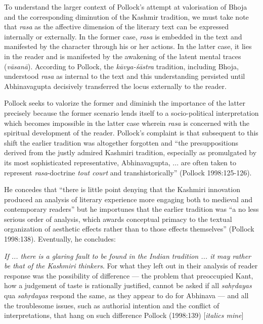 To understand the larger context of Pollock's attempt at valorisation of Bhoja and the corresponding diminution of the Kashmir tradition, we must take note that \textsl{rasa} as the affective dimension of the literary text can be expressed internally or externally. In the former case, \textsl{rasa} is embedded in the text and manifested by the character through his or her actions. In the latter case, it lies in the reader and is manifested by the awakening of the latent mental traces (\textsl{vāsanā}). According to Pollock, the \textsl{kāvya-śāstra} tradition, including Bhoja, understood \textsl{rasa} as internal to the text and this understanding persisted until Abhinavagupta decisively transferred the locus externally to the reader. 

Pollock seeks to valorize the former and diminish the importance of the latter precisely because the former scenario lends itself to a socio-political interpretation which becomes impossible in the latter case wherein \textsl{rasa} is concerned with the spiritual development of the reader. Pollock's complaint is that subsequent to this shift the earlier tradition was altogether forgotten and ``the presuppositions derived from the justly admired Kashmiri tradition, especially as promulgated by its most sophisticated representative, Abhinavagupta, ... are often taken to represent \textsl{rasa}-doctrine \textsl{tout court} and transhistorically'' (Pollock 1998:125-126). 

\newpage

He concedes that ``there is little point denying that the Kashmiri innovation produced an analysis of literary experience more engaging both to medieval and contemporary readers'' but he importunes that the earlier tradition was ``a no less serious order of analysis, which awards conceptual primacy to the textual organization of aesthetic effects rather than to those effects themselves'' (Pollock 1998:138). Eventually, he concludes:

\vskip 2pt

\begin{myquote}
{\textsl{If ... there is a glaring fault to be found in the Indian tradition ... it may rather be that of the Kashmiri thinkers}}. For what they left out in their analysis of reader response was the possibility of difference --- the problem that preoccupied Kant, how a judgement of taste is rationally justified, cannot be asked if all \textsl{sahṛdayas} qua \textsl{sahṛdayas} respond the same, as they appear to do for Abhinava --- and all the troublesome issues, such as authorial intention and the conflict of interpretations, that hang on such difference 
\hfill Pollock (1998:139) [\textsl{italics mine}]
\end{myquote}


